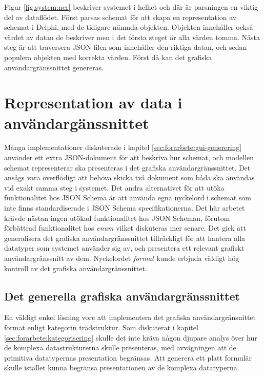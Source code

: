 Figur \ref{fig:system:ner} beskriver systemet i helhet och där är parsningen en viktig del av dataflödet. Först parsas schemat för att skapa en representation av schemat i Delphi, med de tidigare nämnda objekten. Objekten innehåller också värdet av datan de beskriver men i det första steget är alla värden tomma. Nästa steg är att traversera JSON-filen som innehåller den riktiga datan, och sedan populera objekten med korrekta värden. Först då kan det grafiska användargränssnittet genereras.

\section{Representation av data i användargänssnittet}
\label{sec:arbetet:gui}

Många implementationer diskuterade i kapitel \ref{sec:forarbete:gui-generering} använder ett extra JSON-dokument för att beskriva hur schemat, och modellen schemat representerar ska presenteras i det grafiska användargränssnittet. Det ansågs vara överflödigt att behöva skicka två dokument som båda ska användas vid exakt samma steg i systemet. Det andra alternativet för att utöka funktionalitet hos JSON Schema är att använda egna nyckelord i schemat som inte finns standardiserade i JSON Schema specifikationerna. Det här arbetet krävde nästan ingen utökad funktionalitet hos JSON Scheman, förutom förbättrad funktionalitet hos \textit{enum} vilket diskuteras mer senare. Det gick att generalisera det grafiska användargränssnittet tillräckligt för att hantera alla datatyper som systemet använder sig av, och presentera ett relevant grafiskt användargränssnitt av dem. Nyckelordet \textit{format} kunde erbjuda väldigt hög kontroll av det grafiska användargränssnittet.

\subsection{Det generella grafiska användargränssnittet}

En väldigt enkel lösning vore att implementera det grafiska användargränsnittet format enligt kategorin trädstruktur. Som diskuterat i kapitel \ref{sec:forarbete:kategorisering} skulle det inte kräva någon djupare analys över hur de komplexa datastrukturerna skulle presenteras, med avvägningen att de primitiva datatypernas presentation begränsas. Att generera ett platt formulär skulle istället kunna begränsa presentationen av de komplexa datatyperna.

